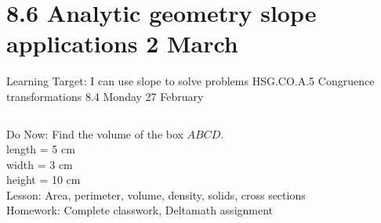 \section{8.6 Analytic geometry slope applications \hfill 2 March \,}
\begin{frame}{Learning Target: I can use slope to solve problems}
  {HSG.CO.A.5 Congruence transformations \hfill \alert{8.4 Monday 27 February}}
  \begin{columns}
    Do Now: Find the volume of the box $ABCD$. \\
    length = 5 cm \\
    width = 3 cm\\
    height = 10 cm \\[0.5cm]
    Lesson: Area, perimeter, volume, density, solids, cross sections \\
    Homework: Complete classwork, Deltamath assignment
    \begin{flushright}
    \end{flushright}
  \end{columns}
\end{frame}

